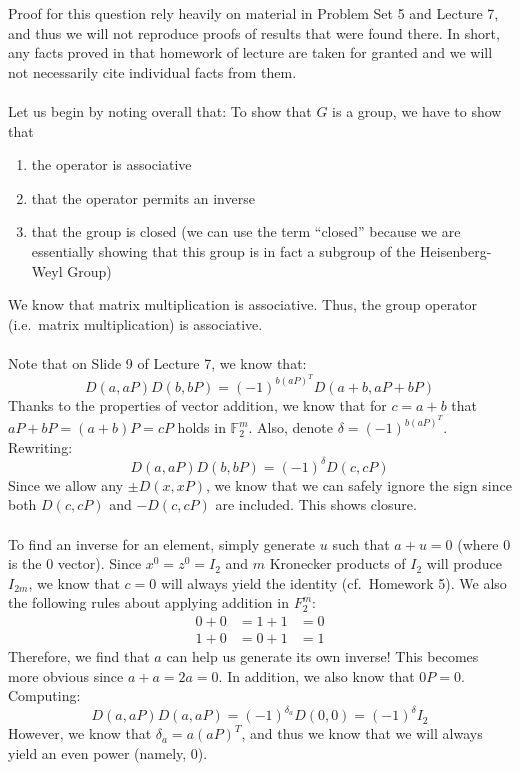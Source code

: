 \documentclass[letterpaper]{article}
\begin{document}
Proof for this question rely heavily on material in Problem Set 5 and Lecture 7, and thus we will not reproduce proofs of results that were found there.
In short, any facts proved in that homework of lecture are taken for granted and we will not necessarily cite individual facts from them.
\\ \\
Let us begin by noting overall that:
To show that $ G $ is a group, we have to show that
\begin{enumerate}
    \item the operator is associative
    \item that the operator permits an inverse
    \item that the group is closed (we can use the term ``closed'' because we are essentially showing that this group is in fact a subgroup of the Heisenberg-Weyl Group)
\end{enumerate}
We know that matrix multiplication is associative.
Thus, the group operator (i.e.\ matrix multiplication) is associative.
\\ \\
Note that on Slide 9 of Lecture 7, we know that:
\[
D(a, aP)D(b, bP) = {(-1)}^{b{(aP)}^T} D(a + b, aP + bP)
\]
Thanks to the properties of vector addition, we know that for $ c = a + b $ that $ aP + bP = (a + b)P = cP $ holds in $ \mathbb{F}_2^m $.
Also, denote $ \delta = {(-1)}^{b{(aP)}^T} $.
Rewriting:
\[
D(a, aP)D(b, bP) = {(-1)}^{\delta} D(c, cP)
\]
Since we allow any $ \pm D(x, xP) $, we know that we can safely ignore the sign since both $ D(c, cP) $ and $ -D(c, cP) $ are included.
This shows closure.
\\ \\
To find an inverse for an element, simply generate $ u $ such that $ a + u = 0 $ (where $ 0 $ is the $ 0 $ vector).
Since $ x^0 = z^0 = I_2 $ and $ m $ Kronecker products of $ I_2 $ will produce $ I_{2m} $, we know that $ c = 0 $ will always yield the identity (cf.\ Homework 5).
We also the following rules about applying addition in $ F_2^m $:
\begin{align}
    0 + 0 &= 1 + 1 &= 0 \\
    1 + 0 &= 0 + 1 &= 1
\end{align}
Therefore, we find that $ a $ can help us generate its own inverse!
This becomes more obvious since $ a + a = 2a = 0 $.
In addition, we also know that $ 0P = 0 $.
Computing:
\[
D(a, aP) D(a, aP) = {(-1)}^{\delta_a} D(0, 0) = {(-1)}^{\delta} I_2
\]
However, we know that $ \delta_a = a{(aP)}^T $, and thus we know that we will always yield an even power (namely, $ 0 $).
\end{document}
